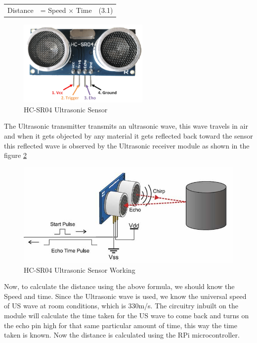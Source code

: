 \begin{tabular}{lcr}
Distance &= Speed × Time & (3.1)\\
\end{tabular}
\begin{figure}[h]\centering
\includegraphics[width=2.5in]{./images/USsensor.png}
\caption{HC-SR04 Ultrasonic Sensor}\label{USsensor}
\end{figure}


The Ultrasonic transmitter transmits an ultrasonic wave, this wave travels in air and when it gets objected by any material it gets reflected back toward the sensor this reflected wave is observed by the Ultrasonic receiver module as shown in the figure \ref{USsensorWorking}

\begin{figure}[h]\centering
\includegraphics[width=5in]{./images/USsensorWorking.jpg}
\caption{HC-SR04 Ultrasonic Sensor Working}\label{USsensorWorking}
\end{figure}

Now, to calculate the distance using the above formula, we should know the Speed and time. Since the Ultrasonic wave is used, we know the universal speed of US wave at room conditions, which is 330m/s. The circuitry inbuilt on the module will calculate the time taken for the US wave to come back and turns on the echo pin high for that same particular amount of time, this way the time taken is known. Now the distance is calculated using the RPi microcontroller.

\pagebreak

